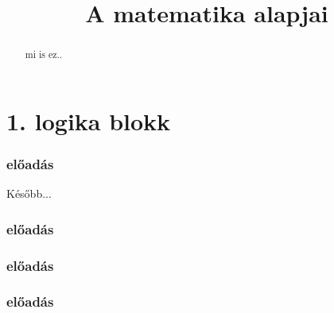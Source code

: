 \documentclass[a4paper]{amsart}
\begin{document}
\title{A matematika alapjai}
\begin{abstract}
mi is ez..
\end{abstract}
\maketitle
\part*{1. logika blokk}
\section{előadás}
Később...
\section{előadás}

\section{előadás}

\section{előadás}

\end{document}
